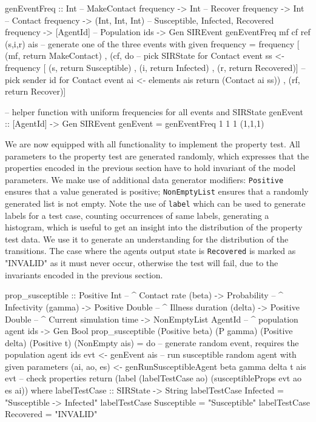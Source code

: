 \begin{HaskellCode}
genEventFreq :: Int             -- MakeContact frequency
             -> Int             -- Recover frequency
             -> Int             -- Contact frequency
             -> (Int, Int, Int) -- Susceptible, Infected, Recovered frequency
             -> [AgentId]       -- Population ids
             -> Gen SIREvent
genEventFreq mf cf ref (s,i,r) ais
  -- generate one of the three events with given frequency
  = frequency [ (mf, return MakeContact)
              , (cf, do
                  -- pick SIRState for Contact event
                  ss <- frequency [ (s, return Susceptible)
                                  , (i, return Infected)
                                  , (r, return Recovered)]
                  -- pick sender id for Contact event
                  ai <- elements ais
                  return (Contact ai ss))
              , (rf, return Recover)]
         
-- helper function with uniform frequencies for all events and SIRState
genEvent :: [AgentId] -> Gen SIREvent
genEvent = genEventFreq 1 1 1 (1,1,1) 
\end{HaskellCode}

We are now equipped with all functionality to implement the property test. All parameters to the property test are generated randomly, which expresses that the properties encoded in the previous section have to hold invariant of the model parameters. We make use of additional data generator modifiers: \texttt{Positive} ensures that a value generated is positive; \texttt{NonEmptyList} ensures that a randomly generated list is not empty. Note the use of \texttt{label} which can be used to generate labels for a test case, counting occurrences of same labels, generating a histogram, which is useful to get an insight into the distribution of the property test data. We use it to generate an understanding for the distribution of the transitions. The case where the agents output state is \texttt{Recovered} is marked as "INVALID" as it must never occur, otherwise the test will fail, due to the invariants encoded in the previous section.

\begin{HaskellCode}
prop_susceptible :: Positive Int         -- ^ Contact rate (beta)
                 -> Probability          -- ^ Infectivity (gamma)
                 -> Positive Double      -- ^ Illness duration (delta)
                 -> Positive Double      -- ^ Current simulation time
                 -> NonEmptyList AgentId -- ^ population agent ids
                 -> Gen Bool
prop_susceptible 
  (Positive beta) (P gamma) (Positive delta) (Positive t) (NonEmpty ais) = do
  -- generate random event, requires the population agent ids
  evt <- genEvent ais
  -- run susceptible random agent with given parameters
  (ai, ao, es) <- genRunSusceptibleAgent beta gamma delta t ais evt
  -- check properties
  return (label (labelTestCase ao) (susceptibleProps evt ao es ai))
  where
    labelTestCase :: SIRState -> String
    labelTestCase Infected    = "Susceptible -> Infected"
    labelTestCase Susceptible = "Susceptible"
    labelTestCase Recovered   = "INVALID"
\end{HaskellCode}


